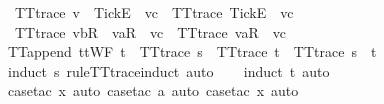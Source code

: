 \begin{isabellebody}
{\ \ {\isachardoublequoteopen}TT{}{\isacharunderscore}trace\ {\isacharparenleft}v\ {\isacharhash}\ {\isacharbrackleft}Tick{\isacharbrackright}\isactrlsub E\ {\isacharhash}\ vc{\isacharparenright}\ {\isacharequal}\ TT{}{\isacharunderscore}trace\ {\isacharparenleft}{\isacharbrackleft}Tick{\isacharbrackright}\isactrlsub E\ {\isacharhash}\ vc{\isacharparenright}{\isachardoublequoteclose}\ {\isacharbar}\isanewline
\ \ {\isachardoublequoteopen}TT{}{\isacharunderscore}trace\ {\isacharparenleft}{\isacharbrackleft}vb{\isacharbrackright}\isactrlsub R\ {\isacharhash}\ {\isacharbrackleft}va{\isacharbrackright}\isactrlsub R\ {\isacharhash}\ vc{\isacharparenright}\ {\isacharequal}\ TT{}{\isacharunderscore}trace\ {\isacharparenleft}{\isacharbrackleft}va{\isacharbrackright}\isactrlsub R\ {\isacharhash}\ vc{\isacharparenright}{\isachardoublequoteclose}%
}%
%
\isamarkupfalse%
\ TT{}{\isacharunderscore}append{\isacharcolon}\ {\isachardoublequoteopen}ttWF\ t\ {\isasymLongrightarrow}\ TT{}{\isacharunderscore}trace\ s\ {\isasymLongrightarrow}\ TT{}{\isacharunderscore}trace\ t\ {\isasymLongrightarrow}\ TT{}{\isacharunderscore}trace\ {\isacharparenleft}s\ {\isacharat}\ t{\isacharparenright}{\isachardoublequoteclose}\isanewline
%
\isadelimproof
\ \ %
\endisadelimproof
%
\isatagproof
{}\isamarkupfalse%
\ {\isacharparenleft}induct\ s\ rule{\isacharcolon}TT{}{\isacharunderscore}trace{\isachardot}induct{\isacharcomma}\ auto{\isacharparenright}\isanewline
\ \ \isamarkupfalse%
\ {\isacharparenleft}induct\ t{\isacharcomma}\ auto{\isacharparenright}\isanewline
\ \ \isamarkupfalse%
\ {\isacharparenleft}case{\isacharunderscore}tac\ x{\isacharcomma}\ auto{\isacharcomma}\ case{\isacharunderscore}tac\ a{\isacharcomma}\ auto{\isacharcomma}\ case{\isacharunderscore}tac\ x{}{\isacharcomma}\ auto{\isacharparenright}\isanewline
\ \ \isamarkupfalse%
%
\endisatagproof
{\isafoldproof}%

\end{isabellebody}
